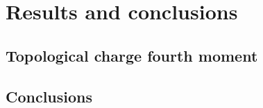 \chapter{Results and conclusions}\label{ch:conclusion}

\section{Topological charge fourth moment}

\section{Conclusions}

